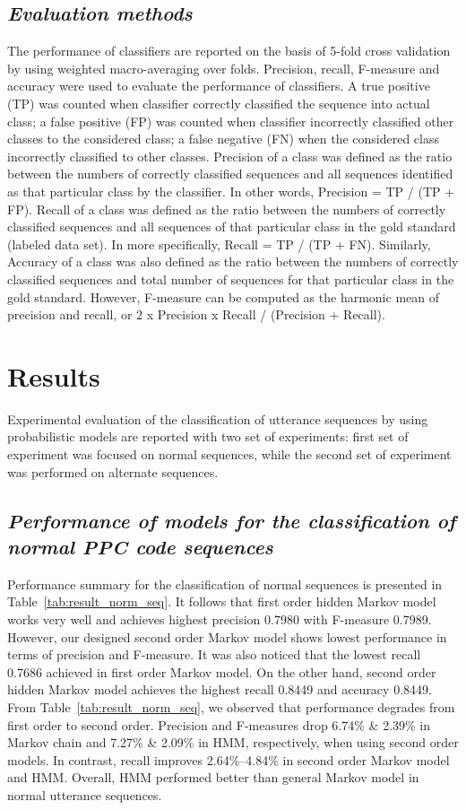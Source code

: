 \documentclass{amia}
\begin{document}
\subsection*{\textit{Evaluation methods}}
The performance of classifiers are reported on the basis of 5-fold cross validation by using weighted macro-averaging over folds. Precision, recall, F-measure and accuracy were used to evaluate the performance of classifiers. A true positive (TP) was counted when classifier correctly classified the sequence into actual class; a false positive (FP) was counted when classifier incorrectly classified other classes to the considered class; a false negative (FN) when the considered class incorrectly classified to other classes. Precision of a class was defined as the ratio between the numbers of correctly classified sequences and all sequences identified as that particular class by the classifier. In other words, Precision = TP / (TP + FP). Recall of a class was defined as the ratio between the numbers of correctly classified sequences and all sequences of that particular class in the gold standard (labeled data set). In more specifically, Recall = TP / (TP + FN). Similarly, Accuracy of a class was also defined as the ratio between the numbers of correctly classified sequences and total number of sequences for that particular class in the gold standard. However, F-measure can be computed as the harmonic mean of precision and recall, or 2 x Precision x Recall / (Precision + Recall).  

\section*{Results}
Experimental evaluation of the classification of utterance sequences by using probabilistic models are reported with two set of experiments: first set of experiment was focused on normal sequences, while the second set of experiment was performed on alternate sequences. 

\subsection*{\textit{Performance of models for the classification of normal PPC code sequences}}
Performance summary for the classification of normal sequences is presented in Table~\ref{tab:result_norm_seq}. It follows that first order hidden Markov model works very well and achieves highest precision 0.7980 with F-measure 0.7989. However, our designed second order Markov model shows lowest performance in terms of precision and F-measure. It was also noticed that the lowest recall 0.7686 achieved in first order Markov model. On the other hand, second order hidden Markov model achieves the highest recall 0.8449 and accuracy 0.8449. From Table~\ref{tab:result_norm_seq}, we observed that performance degrades from first order to second order. Precision and F-measures drop 6.74\% \& 2.39\% in Markov chain and 7.27\% \& 2.09\% in HMM, respectively, when using second order models. In contrast, recall improves 2.64\%--4.84\% in second order Markov model and HMM. Overall, HMM performed better than general Markov model in normal utterance sequences.
\end{document}
